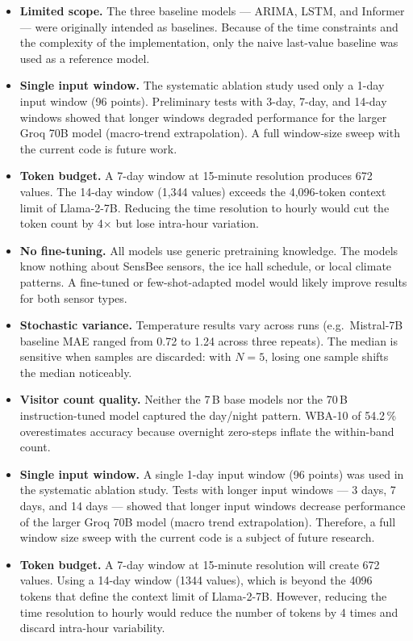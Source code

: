 \documentclass[11pt,a4paper]{article}
\begin{document}
\begin{itemize}[leftmargin=*]
  \item \textbf{Limited scope.} 
  The three baseline models — ARIMA, LSTM, and Informer — were originally intended as baselines. Because of the time constraints and the complexity of the implementation, only the naive last-value baseline was used as a reference model.
  
  \item \textbf{Single input window.} The systematic ablation study used only a 1-day input window (96 points). Preliminary tests with 3-day, 7-day, and 14-day windows showed that longer windows degraded performance for the larger Groq 70B model (macro-trend extrapolation). A full window-size sweep with the current code is future work.
  \item \textbf{Token budget.} A 7-day window at 15-minute resolution produces 672 values. The 14-day window (1{,}344 values) exceeds the 4{,}096-token context limit of Llama-2-7B. Reducing the time resolution to hourly would cut the token count by 4$\times$ but lose intra-hour variation.
  \item \textbf{No fine-tuning.} All models use generic pretraining knowledge. The models know nothing about SensBee sensors, the ice hall schedule, or local climate patterns. A fine-tuned or few-shot-adapted model would likely improve results for both sensor types.
  \item \textbf{Stochastic variance.} Temperature results vary across runs (e.g.\ Mistral-7B baseline MAE ranged from 0.72 to 1.24 across three repeats). The median is sensitive when samples are discarded: with $N = 5$, losing one sample shifts the median noticeably.
  \item \textbf{Visitor count quality.} Neither the 7\,B base models nor the 70\,B instruction-tuned model captured the day/night pattern. WBA-10 of 54.2\,\% overestimates accuracy because overnight zero-steps inflate the within-band count.

  \item \textbf{Single input window.} A single 1-day input window (96 points) was used in the systematic ablation study. Tests with longer input windows — 3 days, 7 days, and 14 days — showed that longer input windows decrease performance of the larger Groq 70B model (macro trend extrapolation). Therefore, a full window size sweep with the current code is a subject of future research.
  
  \item \textbf{Token budget.} A 7-day window at 15-minute resolution will create 672 values. Using a 14-day window (1344 values), which is beyond the 4096 tokens that define the context limit of Llama-2-7B. However, reducing the time resolution to hourly would reduce the number of tokens by 4 times and discard intra-hour variability.
  

\end{itemize}
\end{document}
